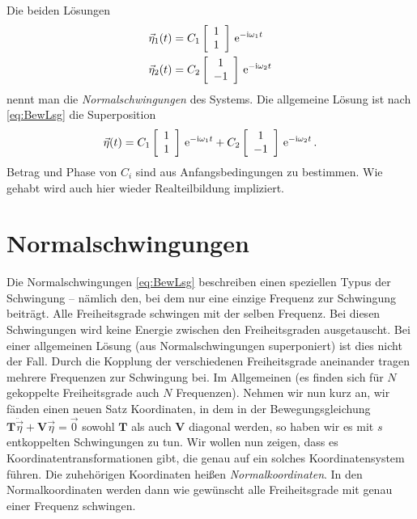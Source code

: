 \documentclass[paper=a4, fontsize=11.0pt, abstractoff, DIV12]{scrartcl}
\begin{document}
Die beiden Lösungen
\begin{align}
\vec\eta_1(t) &= C_1 \ZweierVec{1}{1}\eto{-\ii\omega_1 t}\\
\vec\eta_2(t) &= C_2 \ZweierVec{1}{-1}\eto{-\ii \omega_2 t}
\end{align}
nennt man die \emph{Normalschwingungen} des Systems. Die
allgemeine Lösung ist nach \eqref{eq:BewLsg} die Superposition
\begin{equation}
\vec \eta(t) = C_1 \ZweierVec{1}{1}\eto{-\ii\omega_1 t} + C_2 \ZweierVec{1}{-1}\eto{-\ii \omega_2 t}\, .
\end{equation}
Betrag und Phase von $C_i$ sind aus Anfangsbedingungen zu bestimmen. Wie
gehabt wird auch hier wieder Realteilbildung impliziert.

\section{Normalschwingungen}

Die Normalschwingungen \eqref{eq:BewLsg} beschreiben einen speziellen Typus
der Schwingung -- nämlich den, bei dem nur eine einzige Frequenz zur
Schwingung beiträgt. Alle Freiheitsgrade schwingen mit der selben Frequenz.
Bei diesen Schwingungen wird keine Energie zwischen den Freiheitsgraden
ausgetauscht. Bei einer allgemeinen Lösung (aus Normalschwingungen
superponiert) ist dies nicht der Fall. Durch die Kopplung der verschiedenen
Freiheitsgrade aneinander tragen mehrere Frequenzen zur Schwingung bei. Im
Allgemeinen (es finden sich für $N$ gekoppelte Freiheitsgrade
auch $N$ Frequenzen). Nehmen wir nun kurz an, wir fänden einen neuen Satz
Koordinaten, in dem in der Bewegungsgleichung $\mathbf{T} \ddot{\vec\eta} +
\mathbf{V}{\vec\eta} = \vec 0$ sowohl $\mathbf{T}$ als auch $\mathbf{V}$
diagonal werden, so haben wir es mit $s$ entkoppelten Schwingungen zu tun.
Wir wollen nun zeigen, dass es Koordinatentransformationen gibt, die genau
auf ein solches Koordinatensystem führen. Die zuhehörigen Koordinaten heißen
\emph {Normalkoordinaten}. In den Normalkoordinaten werden dann wie
gewünscht alle Freiheitsgrade mit genau einer Frequenz schwingen.
\end{document}
